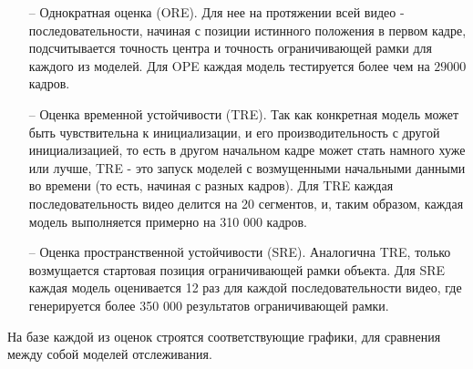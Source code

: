 \begin{itemize}[leftmargin=0em, itemindent=2.5 em,itemsep=1.5 pt,parsep=1.5 pt]

    \item[--] Однократная оценка (ORE). Для нее на протяжении всей видео - последовательности, начиная с позиции истинного положения в первом кадре, подсчитывается точность центра и точность ограничивающей рамки для каждого из моделей. Для OPE каждая модель тестируется более чем на $29 000$ кадров. 
    
    \item[--] Оценка временной устойчивости (TRE). Так как конкретная модель может быть чувствительна к инициализации, и его производительность с другой инициализацией, то есть в другом начальном кадре может стать намного хуже или лучше, TRE - это запуск моделей с возмущенными начальными данными во времени (то есть, начиная с разных кадров). Для TRE каждая последовательность видео делится на 20 сегментов, и, таким образом, каждая модель выполняется примерно на 310 000 кадров.
    
    \item[--] Оценка пространственной устойчивости (SRE). Аналогична TRE, только возмущается стартовая позиция ограничивающей рамки объекта. Для SRE каждая модель оценивается 12 раз для каждой последовательности видео, где генерируется более 350 000 результатов ограничивающей рамки. 
    
\end{itemize}

На базе каждой из оценок строятся соответствующие графики, для сравнения между собой моделей отслеживания.

